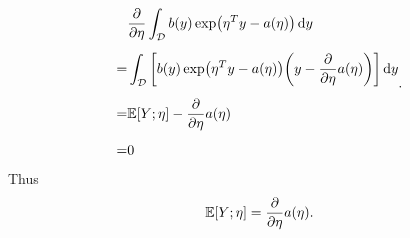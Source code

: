 \begin{answer}
	\[
		\begin{aligned}
			&
			\pdv{\eta}\int_{\mathcal{D}}
			b(y)\exp(\eta^Ty-a(\eta))\,\dd y
			\\[5pt]=&
			\int_{\mathcal{D}}
			\qty[
				b(y)\exp(\eta^Ty-a(\eta))
				\qty(y-\pdv{\eta}a(\eta))
			]
			\,\dd y
			\\[5pt]=&
			\mathbb{E}[Y;\eta]-\pdv{\eta}a(\eta)
			\\[5pt]=&
			0
		\end{aligned}
	.\] 
	Thus
	\[
		\mathbb{E}[Y;\eta]=\pdv{\eta}a(\eta)
	.\] 
\end{answer}
